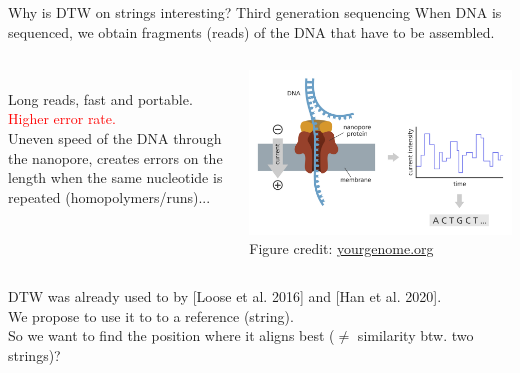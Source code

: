 \begin{frame}{Why is DTW on strings interesting? Third generation sequencing}
    \small
    When DNA is sequenced, we obtain fragments (reads) of the DNA that have to be assembled.\pause
    \begin{columns}
    \smallskip
    \\
    \smallskip
    \textcolor{mygreen}{Long reads, fast and portable.}\\
    \smallskip
    \textcolor{red}{Higher error rate.}\\
    \smallskip
    Uneven speed of the DNA through the nanopore, creates errors on the length when the same nucleotide is repeated (homopolymers/runs)...
    \begin{center}
    \includegraphics[scale=0.20]{figures/ont-sequencing_yourgenome.png}\\
    {\tiny Figure credit: \href{https://www.yourgenome.org/facts/what-is-oxford-nanopore-technology-ont-sequencing/}{yourgenome.org}}
    \end{center}
    
    \end{columns}\pause
    \vfill
    { DTW  was already used to  by [Loose et al. 2016] and [Han et al. 2020].\\ \pause
    We propose to use it to  to a reference (string).\\ \pause
    So we want to find the position where it aligns best ($\neq$ similarity btw. two strings)?}
    
\end{frame}

